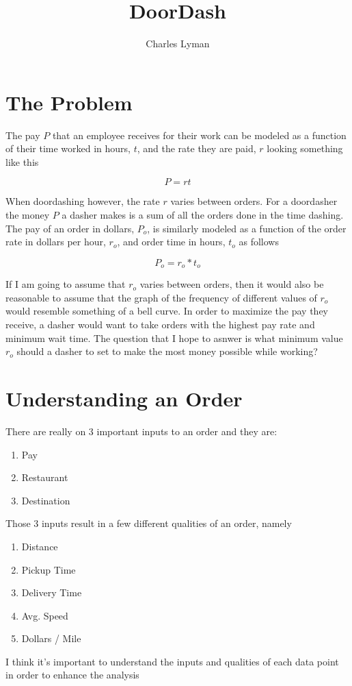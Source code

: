 \documentclass{article}
\title{DoorDash}
\author{Charles Lyman}
\date{}
\begin{document}
\maketitle

\section*{The Problem}
    The pay $P$ that an employee receives for their work can be modeled as a function of their time worked in hours, $t$, and the rate they are paid, $r$ looking something like this
    
        $$P=rt$$
        
\noindent When doordashing however, the rate $r$ varies between orders. For a doordasher the money $P$ a dasher makes is a sum of all the orders done in the time dashing. The pay of an order in dollars, $P_o$, is similarly modeled as a function of the order rate in dollars per hour, $r_o$, and order time in hours, $t_o$ as follows

        $$P_o=r_o*t_o$$
	
\noindent If I am going to assume that $r_o$ varies between orders, then it would also be reasonable to assume that the graph of the frequency of different values of $r_o$ would resemble something of a bell curve. In order to maximize the pay they receive, a dasher would want to take orders with the highest pay rate and minimum wait time. The question that I hope to asnwer is what minimum value $r_o$ should a dasher to set to make the most money possible while working?

\section*{Understanding an Order}

There are really on 3 important inputs to an order and they are:
\begin{enumerate}
    \item Pay
    \item Restaurant
    \item Destination
\end{enumerate}

\noindent Those 3 inputs result in a few different qualities of an order, namely
\begin{enumerate}
    \item Distance
    \item Pickup Time
    \item Delivery Time
    \item Avg. Speed
    \item Dollars / Mile
\end{enumerate}
\noindent I think it's important to understand the inputs and qualities of each data point in order to enhance the analysis
\end{document}
